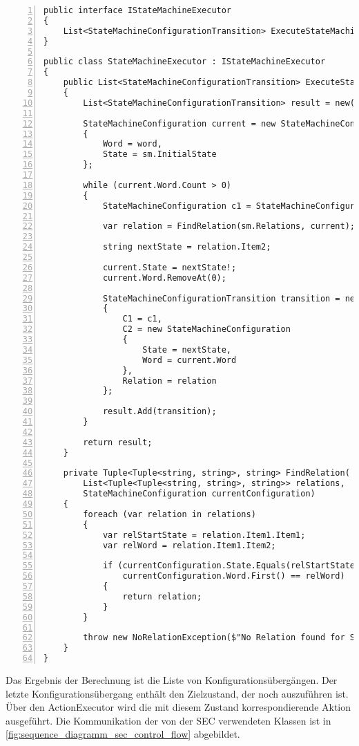 \begin{lstlisting}[language={[Sharp]C}, breaklines=true, tabsize=2, showstringspaces=false, frame=single, numbers=left, basicstyle=\small,label = {lst:statemachineexecutor-csharp}, caption={Modellierung einer StateMachineExecutors in C\#}, captionpos=b] 
public interface IStateMachineExecutor
{
	List<StateMachineConfigurationTransition> ExecuteStateMachine(StateMachine sm, List<Status> word);
}

public class StateMachineExecutor : IStateMachineExecutor
{
	public List<StateMachineConfigurationTransition> ExecuteStateMachine(StateMachine sm, List<string> word)
	{
		List<StateMachineConfigurationTransition> result = new();
		
		StateMachineConfiguration current = new StateMachineConfiguration
		{
			Word = word,
			State = sm.InitialState
		};
		
		while (current.Word.Count > 0)
		{
			StateMachineConfiguration c1 = StateMachineConfiguration.Clone(current);
			
			var relation = FindRelation(sm.Relations, current);
			
			string nextState = relation.Item2;
						
			current.State = nextState!;
			current.Word.RemoveAt(0);
			
			StateMachineConfigurationTransition transition = new()
			{
				C1 = c1,
				C2 = new StateMachineConfiguration
				{
					State = nextState,
					Word = current.Word
				},
				Relation = relation
			};
			
			result.Add(transition);
		}
		
		return result;
	}
	
	private Tuple<Tuple<string, string>, string> FindRelation(
		List<Tuple<Tuple<string, string>, string>> relations, 	
		StateMachineConfiguration currentConfiguration)
	{
		foreach (var relation in relations)
		{
			var relStartState = relation.Item1.Item1;
			var relWord = relation.Item1.Item2;
			
			if (currentConfiguration.State.Equals(relStartState) && 
				currentConfiguration.Word.First() == relWord)
			{
				return relation;
			}
		}
		
		throw new NoRelationException($"No Relation found for State = [{currentConfiguration.State}] and Element = [{currentConfiguration.Word.First()}]");
	}
}
\end{lstlisting}

Das Ergebnis der Berechnung ist die Liste von Konfigurationsübergängen. Der letzte Konfigurationsübergang enthält den Zielzustand, der noch auszuführen ist. Über den ActionExecutor wird die mit diesem Zustand korrespondierende Aktion ausgeführt. Die Kommunikation der von der SEC verwendeten Klassen ist in \cref{fig:sequence_diagramm_sec_control_flow} abgebildet. 

